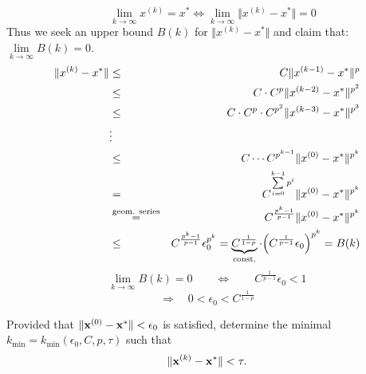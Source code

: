 \begin{problem}
\begin{subproblem}[3]
    
    \begin{solution}
    $$\quad\lim\limits_{k\rightarrow\infty} x^{(k)}=x^* \iff \lim\limits_{k\rightarrow\infty}\Vert x^{(k)}-x^*\Vert=0$$
    Thus we seek an upper bound $B(k)$ for $\Vert x^{(k)}-x^*\Vert$ and claim that: $\lim\limits_{k\rightarrow\infty} B(k)=0$.  
        \begin{eqnarray}\Vert x^{(k)}-x^*\Vert &\le& C \Vert x^{(k-1)}-x^*\Vert^p \notag\\
                                                   &\le& C\cdot C^p \Vert x^{(k-2)}-x^* \Vert^{p^2} \notag \\
                                                   &\le& C\cdot C^p\cdot C^{p^2} \Vert x^{(k-3)}-x^*\Vert^{p^3} \notag \\
                                                   &\vdots& \notag \\
                                                   &\le& C\cdots C^{p^{k-1}}\Vert x^{(0)}-x^*\Vert^{p^k}\notag \\ 
                                                   &=& C^{\sum\limits_{i=0}^{k-1} p^i}\Vert x^{(0)}-x^*\Vert^{p^k}\notag \\
                                                   &\stackrel{\text{geom. series}}{=}& C^{\frac{p^k -1}{p-1}}\Vert x^{(0)}-x^*\Vert^{p^k}\notag \\
                                                   &\le& C^{\frac{p^k -1}{p-1}} \epsilon_0^{p^k} = \underbrace{C^{\frac{1}{1-p}}}_{\text{const.}}
                                                     \cdot\Big(C^{\frac{1}{p-1}}\epsilon_0\Big)^{p^k} = B(k) \notag
        \end{eqnarray}
     $$\lim\limits_{k\rightarrow\infty}B(k)=0 \qquad \iff \qquad  C^{\frac{1}{p-1}}\epsilon_0< 1$$
    $$\Longrightarrow \quad 0<\epsilon_0 < C^{\frac{1}{1-p}} $$
  \end{solution}
    \end{subproblem}
    \begin{subproblem}[2]
      Provided that $\Vert {\mathbf{x}}^{(0)}-{\mathbf{x}}^*\Vert < \epsilon_0$ is satisfied, determine
      the minimal $k_{\min}=k_{\min}(\epsilon_0,C,p,\tau)$ such that
    $$\Vert {\mathbf{x}}^{(k)}-{\mathbf{x}}^*\Vert < \tau.$$
    

\end{subproblem}
\end{problem}
